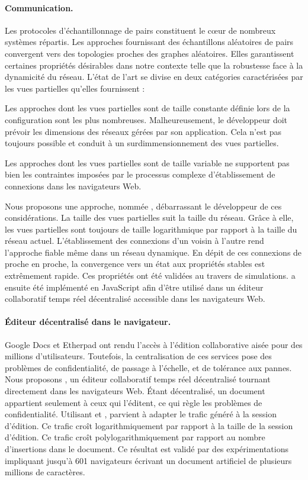 \paragraph{Communication.} Les protocoles d'échantillonnage de pairs constituent
le cœur de nombreux systèmes répartis. Les approches fournissant des
échantillons aléatoires de pairs convergent vers des topologies proches des
graphes aléatoires. Elles garantissent certaines propriétés désirables dans
notre contexte telle que la robustesse face à la dynamicité du réseau.  L'état de
l'art se divise en deux catégories caractérisées par les vues partielles
qu'elles fournissent :
\begin{inparaenum}[(i)]
\item Les approches dont les vues partielles sont de taille constante définie
  lors de la configuration sont les plus nombreuses. Malheureusement, le
  développeur doit prévoir les dimensions des réseaux gérées par son
  application. Cela n'est pas toujours possible et conduit à un
  surdimmensionnement des vues partielles.
\item Les approches dont les vues partielles sont de taille variable ne
  supportent pas bien les contraintes imposées par le processus complexe
  d'établissement de connexions dans les navigateurs Web.
\end{inparaenum}
Nous proposons une approche, nommée \SPRAY, débarrassant le développeur de ces
considérations. La taille des vues partielles suit la taille du réseau. Grâce à
elle, les vues partielles sont toujours de taille logarithmique par rapport à la
taille du réseau actuel. L'établissement des connexions d'un voisin à l'autre
rend l'approche fiable même dans un réseau dynamique. En dépit de ces connexions
de proche en proche, la convergence vers un état aux propriétés stables est
extrêmement rapide. Ces propriétés ont été validées au travers de
simulations. \SPRAY a ensuite été implémenté en JavaScript afin d'être utilisé
dans un éditeur collaboratif temps réel décentralisé accessible dans les
navigateurs Web.

\paragraph{Éditeur décentralisé dans le navigateur.} Google Docs et Etherpad ont
rendu l'accès à l'édition collaborative aisée pour des millions
d'utilisateurs. Toutefois, la centralisation de ces services pose des problèmes
de confidentialité, de passage à l'échelle, et de tolérance aux pannes. Nous
proposons \CRATE, un éditeur collaboratif temps réel décentralisé tournant
directement dans les navigateurs Web. Étant décentralisé, un document appartient
seulement à ceux qui l'éditent, ce qui règle les problèmes de
confidentialité. Utilisant \SPRAY et \LSEQ, \CRATE parvient à adapter le trafic
généré à la session d'édition. Ce trafic croît logarithmiquement par rapport à
la taille de la session d'édition. Ce trafic croît polylogarithmiquement par
rapport au nombre d'insertions dans le document. Ce résultat est validé par des
expérimentations impliquant jusqu'à 601 navigateurs écrivant un document
artificiel de plusieurs millions de caractères.

